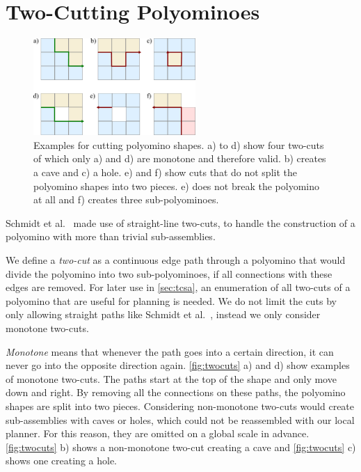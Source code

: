 \section{Two-Cutting Polyominoes}
\label{sec:twocutting}

\begin{figure}
	\centering
	\includegraphics[width=0.55\textwidth]{figures/twocuts.pdf}
	\caption[Different cuts for polyomino shapes]{Examples for cutting polyomino shapes. a) to d) show four two-cuts of which only a) and d) are monotone and therefore valid. b) creates a cave and c) a hole. e) and f) show cuts that do not split the polyomino shapes into two pieces. e) does not break the polyomino at all and f) creates three sub-polyominoes.}
	\label{fig:twocuts}
\end{figure}

Schmidt et al.\ \cite{Schmidt2018} made use of straight-line two-cuts, to handle the construction of a polyomino with more than trivial sub-assemblies.

We define a \textit{two-cut} as a continuous edge path through a polyomino that would divide the polyomino into two sub-polyominoes, if all connections with these edges are removed.
For later use in \autoref{sec:tcsa}, an enumeration of all two-cuts of a polyomino that are useful for planning is needed.
We do not limit the cuts by only allowing straight paths like Schmidt et al.\ \cite{Schmidt2018}, instead we only consider monotone two-cuts.

\textit{Monotone} means that whenever the path goes into a certain direction, it can never go into the opposite direction again.
\autoref{fig:twocuts} a) and d) show examples of monotone two-cuts.
The paths start at the top of the shape and only move down and right.
By removing all the connections on these paths, the polyomino shapes are split into two pieces.
Considering non-monotone two-cuts would create sub-assemblies with caves or holes, which could not be reassembled with our local planner.
For this reason, they are omitted on a global scale in advance.
\autoref{fig:twocuts} b) shows a non-monotone two-cut creating a cave and \autoref{fig:twocuts} c) shows one creating a hole.

